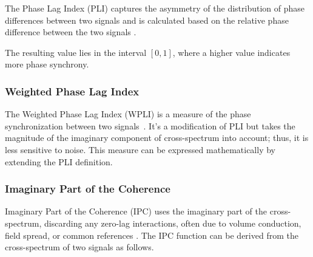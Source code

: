 The Phase Lag Index (PLI) captures the asymmetry of the distribution of phase differences between two signals and is calculated based on the relative phase difference between the two signals \cite{siviero2023functional}.


The resulting value lies in the interval $[0,1]$, where a higher value indicates more phase synchrony.

\subsubsection{Weighted Phase Lag Index}
The Weighted Phase Lag Index (WPLI) is a measure of the phase synchronization between two signals~\cite{gonzalez2020network}. It's a modification of PLI but takes the magnitude of the imaginary component of cross-spectrum into account; thus, it is less sensitive to noise. This measure can be expressed mathematically by extending the PLI definition.


\subsubsection{Imaginary Part of the Coherence}

Imaginary Part of the Coherence (IPC) uses the imaginary part of the cross-spectrum, discarding any zero-lag interactions, often due to volume conduction, field spread, or common references \cite{cao2022brain}.
The IPC function can be derived from the cross-spectrum of two signals as follows.

